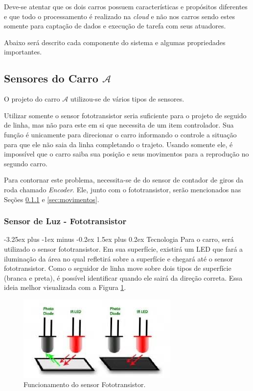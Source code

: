 \documentclass[portugues, brazil, a4paper,12pt]{article}
\makeatletter
\renewcommand{\paragraph}{\@startsection{paragraph}{4}{0ex}%
   {-3.25ex plus -1ex minus -0.2ex}%
   {1.5ex plus 0.2ex}%
   {\normalfont\normalsize\bfseries}}
\makeatother
\begin{document}
		Deve-se atentar que os dois carros possuem características e propósitos diferentes e que todo o processamento é realizado na \textit{cloud} e não nos carros sendo estes somente para captação de dados e execução de tarefa com seus atuadores.

		Abaixo será descrito cada componente do sistema e algumas propriedades importantes.

	\subsection{Sensores do Carro $ \mathcal{A} $}
		O projeto do carro $ \mathcal{A} $ utilizou-se de vários tipos de sensores.

		Utilizar somente o sensor fototransistor seria suficiente para o projeto de seguido de linha, mas não para este em si que necessita de um item controlador. Sua função é unicamente para direcionar o carro informando o controle a situação para que ele não saia da linha completando o trajeto. Usando somente ele, é impossível que o carro saiba sua posição e seus movimentos para a reprodução no segundo carro.

		Para contornar este problema, necessita-se de do sensor de contador de giros da roda chamado \textit{Encoder}. Ele, junto com o fototransistor, serão mencionados nas Seções \ref{sec:fototransistor} e \ref{sec:movimentos}.


		\subsubsection{Sensor de Luz - Fototransistor} \label{sec:fototransistor}

			\paragraph{Tecnologia}
				Para o carro, será utilizado o sensor fototransistor. Em sua superfície, existirá um LED que fará a iluminação da área no qual refletirá sobre a superfície e chegará até o sensor fototransistor. Como o seguidor de linha move sobre dois tipos de superfície (branca e preta), é possível identificar quando ele sairá da direção correta. Essa ideia melhor visualizada com a Figura \ref{fig:ft}.

				\begin{figure}[h]
					\centering
					\includegraphics[width=0.45\linewidth]{img/elementos-fototransistor.jpg}
					\caption{Funcionamento do sensor Fototransistor.}
					\label{fig:ft}
				\end{figure}
\end{document}
